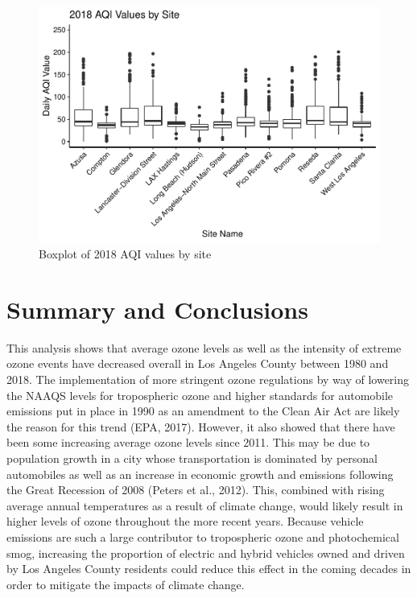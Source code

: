 \documentclass[12pt,]{article}
\begin{document}
\begin{figure}
\centering
\includegraphics{Roth_ENV872_Project_files/figure-latex/box plot 5-1.pdf}
\caption{Boxplot of 2018 AQI values by site}
\end{figure}

\newpage

\section{Summary and Conclusions}\label{summary-and-conclusions}

This analysis shows that average ozone levels as well as the intensity
of extreme ozone events have decreased overall in Los Angeles County
between 1980 and 2018. The implementation of more stringent ozone
regulations by way of lowering the NAAQS levels for tropospheric ozone
and higher standards for automobile emissions put in place in 1990 as an
amendment to the Clean Air Act are likely the reason for this trend
(EPA, 2017). However, it also showed that there have been some
increasing average ozone levels since 2011. This may be due to
population growth in a city whose transportation is dominated by
personal automobiles as well as an increase in economic growth and
emissions following the Great Recession of 2008 (Peters et al., 2012).
This, combined with rising average annual temperatures as a result of
climate change, would likely result in higher levels of ozone throughout
the more recent years. Because vehicle emissions are such a large
contributor to tropospheric ozone and photochemical smog, increasing the
proportion of electric and hybrid vehicles owned and driven by Los
Angeles County residents could reduce this effect in the coming decades
in order to mitigate the impacts of climate change.
\end{document}
